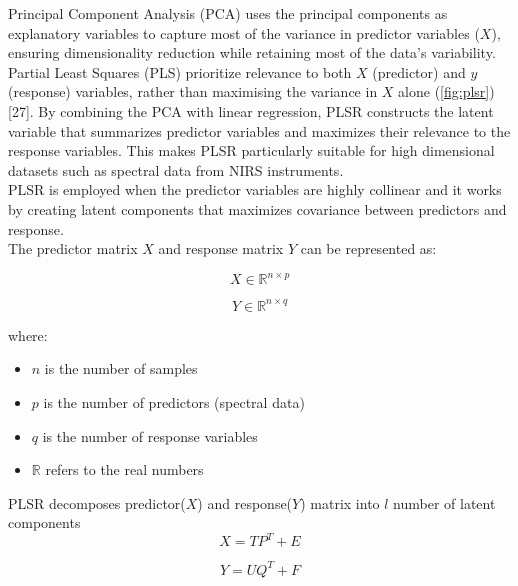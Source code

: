 \documentclass[12pt,a4paper]{report}
\begin{document}
Principal Component Analysis (PCA) uses the principal components as explanatory variables to capture most of the variance in predictor variables ($X$), ensuring dimensionality reduction while retaining most of the data’s variability. 
Partial Least Squares (PLS) prioritize relevance to both $X$ (predictor) and $y$ (response) variables, rather than maximising the variance in $X$ alone (\ref{fig:plsr}) [27]. By combining the PCA with linear regression, PLSR constructs 
the latent variable that summarizes predictor variables and maximizes their relevance to the response variables. This makes PLSR particularly suitable for high dimensional datasets such as spectral data from NIRS instruments. \\

PLSR is employed when the predictor variables are highly collinear and it works by creating latent components that maximizes covariance between predictors and response. \\

The predictor matrix \( X \) and response matrix \( Y \) can be represented as:

\begin{equation}
    X \in \mathbb{R}^{n \times p}
\end{equation}

\begin{equation}
    Y \in \mathbb{R}^{n \times q}
\end{equation}

where:
\begin{itemize}
    \item \( n \) is the number of samples
    \item \( p \) is the number of predictors (spectral data)
    \item \( q \) is the number of response variables
    \item $\mathbb{R}$ refers to the real numbers
\end{itemize}

PLSR decomposes predictor($X$) and response($Y$) matrix into $l$ number of latent components\\

\begin{equation}
    X = T P^T + E
\end{equation}

\begin{equation}
    Y = U Q^T + F
\end{equation}
\end{document}
